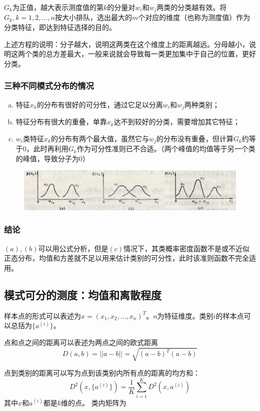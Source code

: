 \documentclass[12pt, letterpaper]{article}
\begin{document}
$G_k$为正值，越大表示测度值的第$k$的分量对$w_i$和$w_j$两类的分类越有效。将${G_k,k=1,2,\ldots,n}$按大小排队，选出最大的$m$个对应的维度（也称为测度值）作为分类特征，即达到特征选择的目的。

上述方程的说明：分子越大，说明这两类在这个维度上的距离越远。分母越小，说明这两个类的总方差最大，一般来说就会导致每一类更加集中于自己的位置，更好分类。

\subsubsection*{三种不同模式分布的情况}
\begin{enumerate}[(a)]	%
\item 特征$x_k$的分布有很好的可分性，通过它足以分离$w_i$和$w_j$两种类别；
\item 特征分布有很大的重叠，单靠$x_k$达不到较好的分类，需要增加其它特征；
\item $w_i$类特征$x_k$的分布有两个最大值，虽然它与$w_j$的分布没有重叠，但计算$G_k$约等于$0$，此时再利用$G_k$作为可分性准则已不合适。（两个峰值的均值等于另一个类的峰值，导致分子为0）
\end{enumerate}
\begin{figure}[ht]
\centering
\includegraphics[scale=0.4]{三种情况.png}
\end{figure}
\subsubsection*{结论}
$(a),(b)$可以用公式分析，但是$(c)$情况下，其类概率密度函数不是或不近似正态分布，均值和方差就不足以用来估计类别的可分性，此时该准则函数不完全适用。



\subsection{模式可分的测度：均值和离散程度}
样本点的形式可以表述为$x=(x_1,x_2,\ldots,x_n)^T$。$n$为特征维度。类别$i$的样本点可以总括为$\{a^{(i)}\}$。

点和点之间的距离可以表述为两点之间的欧式距离
$$D(a,b)=||a-b||=\sqrt{(a-b)^T(a-b)}$$

点到类别的距离可以写为点到该类别内所有点的距离的均方和：
$$\overline{D^2(x,\{a^(i)\})}=\frac{1}{K}\sum_{i=1}^KD^2(x,a^{(i)})$$
其中$x$和$a^{(i)}$都是$k$维的点。
类内矩阵为
\end{document}
